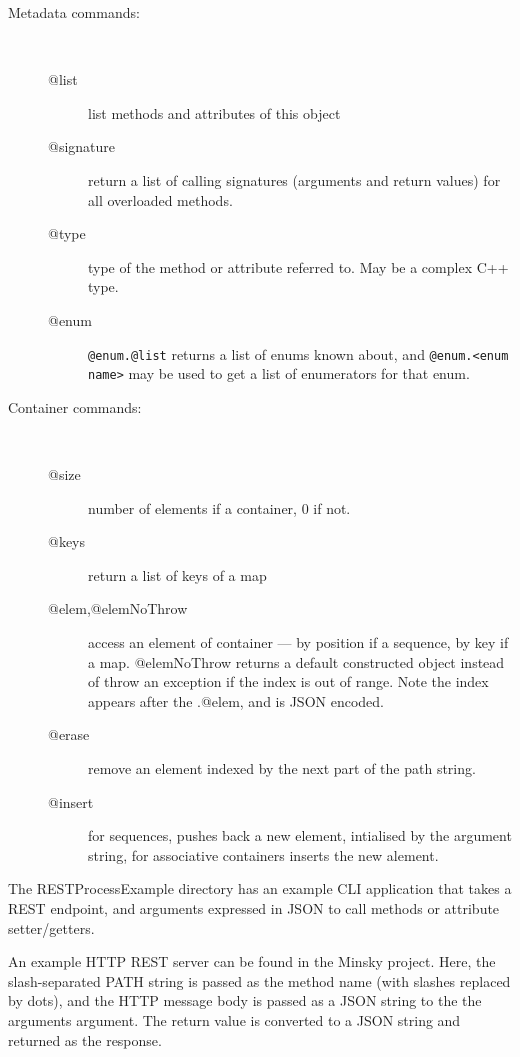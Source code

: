\begin{description}
\item[Metadata commands:]\mbox{}\\
  \begin{description}
  \item[@list] list methods and attributes of this object
  \item[@signature] return a list of calling signatures (arguments and
    return values) for all overloaded methods.
  \item[@type] type of the method or attribute referred to. May be a
    complex C++ type.
  \item[@enum] \verb+@enum.@list+ returns a list of enums known about,
    and \verb+@enum.<enum name>+ may be used to get a list of
    enumerators for that enum.
  \end{description}

\item[Container commands:]\mbox{}\\
  \begin{description}
  \item[@size] number of elements if a container, 0 if not.
  \item[@keys] return a list of keys of a map
  \item[@elem,@elemNoThrow] access an element of container --- by position if a
    sequence, by key if a map. @elemNoThrow returns a default
    constructed object instead of throw an exception if the index is out
    of range. Note the index appears after the .@elem, and is JSON encoded.
  \item[@erase] remove an element indexed by the next part of the path
    string.
  \item[@insert] for sequences, pushes back a new element, intialised by
    the argument string, for associative containers inserts the new
    alement.
  \end{description}
\end{description}


The RESTProcessExample directory has an example CLI application that
takes a REST endpoint, and arguments expressed in JSON to call methods
or attribute setter/getters.

An example HTTP REST server can be found in the Minsky project. Here,
the slash-separated PATH string is passed as the method name (with
slashes replaced by dots), and the HTTP message body is passed as a
JSON string to the the arguments argument. The return value is
converted to a JSON string and returned as the response.

